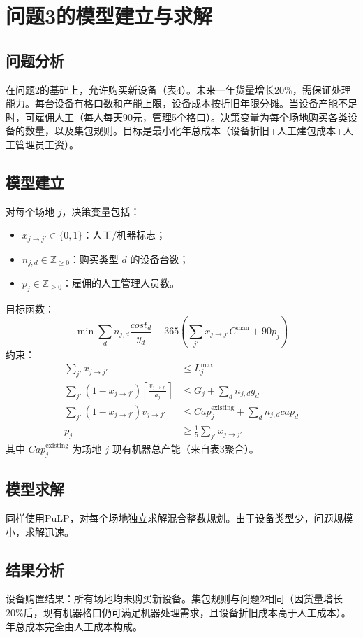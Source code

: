 \documentclass[12pt,a4paper]{ctexart}
\begin{document}
\section{问题3的模型建立与求解}

\subsection{问题分析}
在问题2的基础上，允许购买新设备（表4）。未来一年货量增长20\%，需保证处理能力。每台设备有格口数和产能上限，设备成本按折旧年限分摊。当设备产能不足时，可雇佣人工（每人每天90元，管理5个格口）。决策变量为每个场地购买各类设备的数量，以及集包规则。目标是最小化年总成本（设备折旧+人工建包成本+人工管理员工资）。

\subsection{模型建立}
对每个场地 $j$，决策变量包括：
\begin{itemize}
    \item $x_{j\to j'}\in\{0,1\}$：人工/机器标志；
    \item $n_{j,d}\in\mathbb{Z}_{\ge0}$：购买类型 $d$ 的设备台数；
    \item $p_j\in\mathbb{Z}_{\ge0}$：雇佣的人工管理人员数。
\end{itemize}
目标函数：
\[
\min \sum_{d} n_{j,d} \frac{cost_d}{y_d} + 365 \left( \sum_{j'} x_{j\to j'} C^{\text{man}} + 90 p_j \right)
\]
约束：
\begin{align}
    \sum_{j'} x_{j\to j'} &\le L_j^{\max} \\
    \sum_{j'} (1-x_{j\to j'}) \left\lceil \frac{v_{j\to j'}}{a_j} \right\rceil &\le G_j + \sum_d n_{j,d} g_d \\
    \sum_{j'} (1-x_{j\to j'}) v_{j\to j'} &\le Cap_j^{\text{existing}} + \sum_d n_{j,d} cap_d \\
    p_j &\ge \frac{1}{5} \sum_{j'} x_{j\to j'}
\end{align}
其中 $Cap_j^{\text{existing}}$ 为场地 $j$ 现有机器总产能（来自表3聚合）。

\subsection{模型求解}
同样使用PuLP，对每个场地独立求解混合整数规划。由于设备类型少，问题规模小，求解迅速。

\subsection{结果分析}
设备购置结果：所有场地均未购买新设备。集包规则与问题2相同（因货量增长20\%后，现有机器格口仍可满足机器处理需求，且设备折旧成本高于人工成本）。年总成本完全由人工成本构成。
\end{document}
